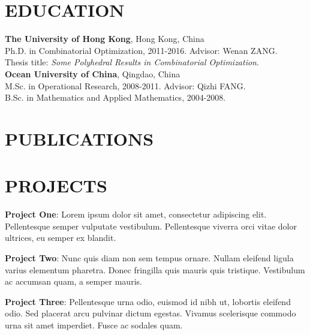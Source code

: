 \documentclass[margin]{res}
\begin{document}
\begin{resume}
\section{EDUCATION}
\textbf{The University of Hong Kong}, Hong Kong, China\\
Ph.D. in Combinatorial Optimization, 2011-2016. Advisor: Wenan ZANG.\\
Thesis title: {\sl Some Polyhedral Results in Combinatorial Optimization}.\\


\vspace{-2.5pt}
\textbf{Ocean University of China}, Qingdao, China\\
{M.Sc.} in Operational Research, 2008-2011. Advisor: Qizhi FANG.\\
{B.Sc.} in Mathematics and Applied Mathematics, 2004-2008.
\section{PUBLICATIONS}


\nocite{*}

\section{PROJECTS}
\par
\textbf{Project One}: 
Lorem ipsum dolor sit amet, consectetur adipiscing elit. Pellentesque semper 
vulputate vestibulum. Pellentesque viverra orci vitae dolor ultrices, eu semper 
ex blandit. 

\par
\textbf{Project Two}:
Nunc quis diam non sem tempus ornare. Nullam eleifend ligula varius 
elementum pharetra. Donec fringilla quis mauris quis tristique. Vestibulum ac 
accumsan quam, a semper mauris. 
\par
\textbf{Project Three}: 
Pellentesque urna odio, euismod id nibh ut,  lobortis eleifend odio. Sed 
placerat arcu pulvinar dictum egestas. Vivamus  scelerisque commodo urna sit 
amet imperdiet. Fusce ac sodales quam.


\end{resume}
\end{document}
